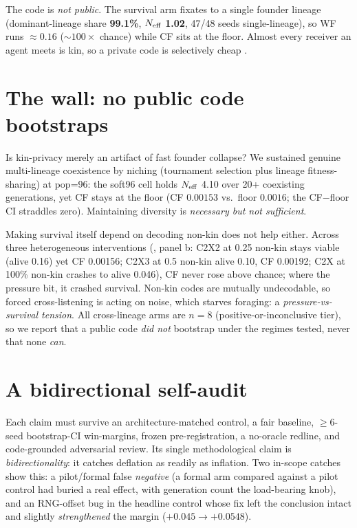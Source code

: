\documentclass[letterpaper]{article}
\begin{document}
The code is \emph{not public}. The survival arm fixates to a single founder lineage
(dominant-lineage share \textbf{99.1\%}, $N_{\rm eff}$ \textbf{1.02}, 47/48 seeds
single-lineage), so WF runs ${\approx}0.16$ (${\sim}100\times$ chance) while CF sits at the
floor. Almost every receiver an agent meets is kin, so a private code is selectively cheap
\citep{hamilton1964}.

\section{The wall: no public code bootstraps}
Is kin-privacy merely an artifact of fast founder collapse? We sustained genuine multi-lineage
coexistence by niching (tournament selection plus lineage fitness-sharing) at pop=96: the
soft96 cell holds $N_{\rm eff}$ 4.10 over 20+ coexisting generations, yet CF stays at the floor
(CF $0.00153$ vs.\ floor $0.0016$; the CF$-$floor CI straddles zero). Maintaining diversity is
\emph{necessary but not sufficient}.

Making survival itself depend on decoding non-kin does not help either. Across three
heterogeneous interventions (, panel b: C2X2 at 0.25 non-kin stays viable
(alive 0.16) yet CF 0.00156; C2X3 at 0.5 non-kin alive 0.10, CF 0.00192; C2X at 100\% non-kin
crashes to alive 0.046), CF never rose above chance; where the pressure bit, it crashed
survival. Non-kin codes are mutually undecodable, so forced cross-listening is
acting on noise, which starves foraging: a \emph{pressure-vs-survival tension}. All
cross-lineage arms are $n{=}8$ (positive-or-inconclusive tier), so we report that a public code
\emph{did not} bootstrap under the regimes tested, never that none \emph{can}.


\section{A bidirectional self-audit}
Each claim must survive an architecture-matched control, a fair baseline, $\geq$6-seed
bootstrap-CI win-margins, frozen pre-registration, a no-oracle redline, and code-grounded
adversarial review. Its single methodological claim is \emph{bidirectionality}: it catches
deflation as readily as inflation. Two in-scope catches show this: a pilot/formal false
\emph{negative} (a formal arm compared against a pilot control had buried a real effect, with
generation count the load-bearing knob), and an RNG-offset bug in the headline control whose
fix left the conclusion intact and slightly \emph{strengthened} the margin
($+0.045 \to +0.0548$).
\end{document}
